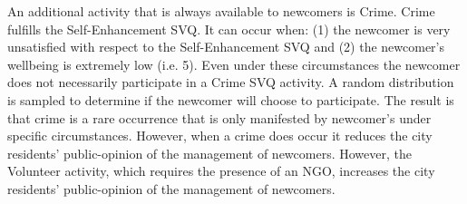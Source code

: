 \documentclass{scspaperproc}
\theoremstyle{scsthe}
\begin{document}
An additional activity that is always available to newcomers is Crime. Crime fulfills the Self-Enhancement SVQ. It can occur when: (1) the newcomer is very unsatisfied with respect to the Self-Enhancement SVQ and (2) the newcomer's wellbeing is extremely low (i.e. 5). Even under these circumstances the newcomer does not necessarily participate in a Crime SVQ activity. A random distribution is sampled to determine if the newcomer will choose to participate. The result is that crime is a rare occurrence that is only manifested by newcomer's under specific circumstances. However, when a crime does occur it reduces the city residents' public-opinion of the management of newcomers. However, the Volunteer activity, which requires the presence of an NGO, increases the city residents' public-opinion of the management of newcomers.
\end{document}
